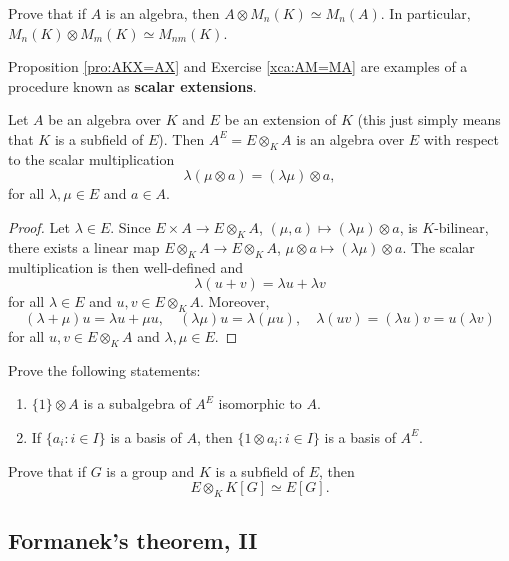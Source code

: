 \begin{exercise}
\label{xca:AM=MA}
	Prove that if $A$ is an algebra, then $A\otimes M_n(K)\simeq M_n(A)$. In
	particular, $M_n(K)\otimes M_m(K)\simeq M_{nm}(K)$.
\end{exercise}

Proposition \ref{pro:AKX=AX} and Exercise \ref{xca:AM=MA} 
are examples of a procedure known as \textbf{scalar extensions}. 

\begin{theorem}
	Let $A$ be an algebra over $K$ and $E$ be an extension of $K$ (this just simply means that
	$K$ is a subfield of $E$). Then 
	$A^E=E\otimes_KA$ is an algebra over $E$ with respect to
	the scalar multiplication 
	\[
		\lambda(\mu\otimes a)=(\lambda\mu)\otimes a,
	\]
	for all $\lambda,\mu\in E$ and $a\in A$.
\end{theorem}

\begin{proof}
	Let $\lambda\in E$. Since $E\times A\to E\otimes_KA$,
	$(\mu,a)\mapsto (\lambda\mu)\otimes a$, is $K$-bilinear, there exists 
	a linear map $E\otimes_KA\to E\otimes_KA$, $\mu\otimes a\mapsto
	(\lambda\mu)\otimes a$. The scalar multiplication is then well-defined and 
	\[
	\lambda(u+v)=\lambda u+\lambda v
	\]
	for all $\lambda\in E$ and $u,v\in E\otimes_KA$. Moreover, 
	\[
	(\lambda+\mu)u=\lambda u+\mu u,
	\quad
	(\lambda\mu)u=\lambda(\mu u),
	\quad
	\lambda(uv)=(\lambda u)v=u(\lambda v)
	\]
	for all $u,v\in E\otimes_KA$ and $\lambda,\mu\in E$.
\end{proof}

\begin{exercise}
    Prove the following statements:
    \begin{enumerate}
		\item $\{1\}\otimes A$ is a subalgebra of $A^E$ isomorphic to $A$.
		\item If $\{a_i:i\in I\}$ is a basis of $A$, then $\{1\otimes a_i:i\in
			I\}$ is a basis of $A^E$.
	\end{enumerate}
\end{exercise}

\begin{exercise}
	Prove that if $G$ is a group and $K$ is a subfield of $E$, then
	\[
	E\otimes_K K[G]\simeq E[G].
	\]
\end{exercise}

\subsection{Formanek's theorem, II}

